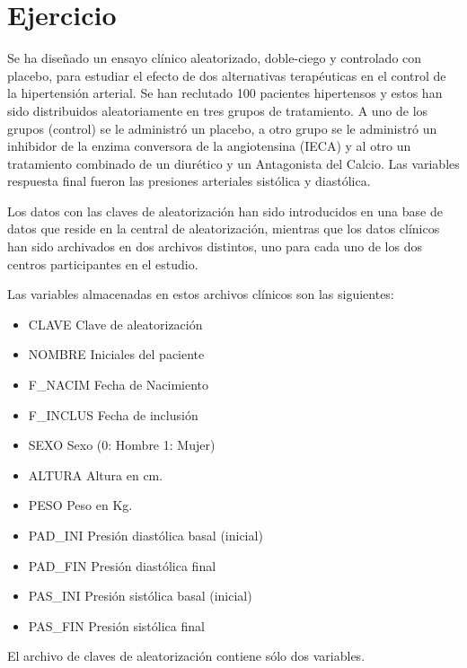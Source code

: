 \documentclass[a4paper]{article}
\begin{document}
\sloppy


\bigskip
\section*{Ejercicio}

Se ha diseñado un ensayo clínico aleatorizado, doble-ciego y
controlado con placebo, para estudiar el efecto de dos
alternativas terapéuticas en el control de la hipertensión
arterial. Se han reclutado 100 pacientes hipertensos y estos han
sido distribuidos aleatoriamente en tres grupos de tratamiento. A
uno de los grupos (control) se le administró un placebo, a otro
grupo se le administró un inhibidor de la enzima conversora de la
angiotensina (IECA) y al otro un tratamiento combinado de un
diurético y un Antagonista del Calcio. Las variables respuesta
final fueron las presiones arteriales sistólica y diastólica.


Los datos con las claves de aleatorización han sido introducidos
en una base de datos que reside en la central de aleatorización,
mientras que los datos clínicos han sido archivados en dos
archivos distintos, uno para cada uno de los dos centros
participantes en el estudio.

Las variables almacenadas en estos archivos clínicos son las
siguientes:




\begin{itemize}
    \item CLAVE Clave de aleatorización
    \item NOMBRE  Iniciales del paciente
    \item F\_NACIM  Fecha de Nacimiento
    \item F\_INCLUS Fecha de inclusión
    \item SEXO  Sexo (0: Hombre 1: Mujer)
    \item ALTURA Altura en cm.
    \item PESO  Peso en Kg.
    \item PAD\_INI  Presión diastólica basal (inicial)
    \item PAD\_FIN  Presión diastólica final
    \item PAS\_INI Presión sistólica basal (inicial)
    \item PAS\_FIN  Presión sistólica final
\end{itemize}

El archivo de claves de aleatorización contiene sólo dos
variables.
\end{document}
